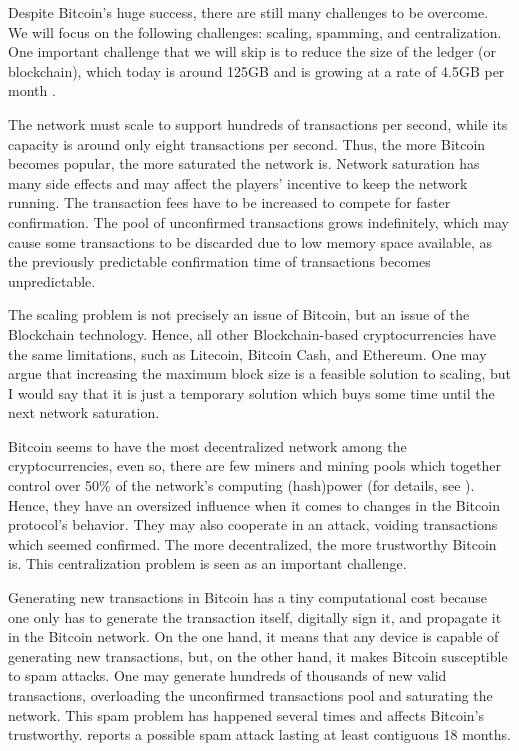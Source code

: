 Despite Bitcoin's huge success, there are still many challenges to be overcome. We will focus on the following challenges: scaling, spamming, and centralization. One important challenge that we will skip is to reduce the size of the ledger (or blockchain), which today is around 125GB and is growing at a rate of 4.5GB per month \citep{blockchaininfosize}.

The network must scale to support hundreds of transactions per second, while its capacity is around only eight transactions per second. Thus, the more Bitcoin becomes popular, the more saturated the network is. Network saturation has many side effects and may affect the players' incentive to keep the network running. The transaction fees have to be increased to compete for faster confirmation. The pool of unconfirmed transactions grows indefinitely, which may cause some transactions to be discarded due to low memory space available, as the previously predictable confirmation time of transactions becomes unpredictable.

The scaling problem is not precisely an issue of Bitcoin, but an issue of the Blockchain technology. Hence, all other Blockchain-based cryptocurrencies have the same limitations, such as Litecoin, Bitcoin Cash, and Ethereum. One may argue that increasing the maximum block size is a feasible solution to scaling, but I would say that it is just a temporary solution which buys some time until the next network saturation.

Bitcoin seems to have the most decentralized network among the cryptocurrencies, even so, there are few miners and mining pools which together control over 50\% of the network’s computing (hash)power (for details, see \citet{gencer2018decentralization}). Hence, they have an oversized influence when it comes to changes in the Bitcoin protocol's behavior. They may also cooperate in an attack, voiding transactions which seemed confirmed. The more decentralized, the more trustworthy Bitcoin is. This centralization problem is seen as an important challenge.

Generating new transactions in Bitcoin has a tiny computational cost because one only has to generate the transaction itself, digitally sign it, and propagate it in the Bitcoin network. On the one hand, it means that any device is capable of generating new transactions, but, on the other hand, it makes Bitcoin susceptible to spam attacks. One may generate hundreds of thousands of new valid transactions, overloading the unconfirmed transactions pool and saturating the network. This spam problem has happened several times and affects Bitcoin's trustworthy. \citet{bitcoinspam2017} reports a possible spam attack lasting at least contiguous 18 months.

